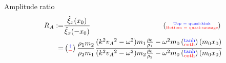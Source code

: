 \documentclass[table]{beamer}
\begin{document}
\begin{frame}
\begin{figure}
\end{figure}
\vspace{-0.3cm}
\begin{block}{Amplitude ratio}
\vspace{-0.3cm}
\begin{align*}
R_A :=& \frac{\hat{\xi}_x(x_0)}{\hat{\xi}_x(-x_0)} \qquad \qquad \qquad \qquad \qquad \left(\substack{\text{\textcolor{blue}{\tiny Top = quasi-kink}} \\ \text{\tiny \textcolor{red}{Bottom = quasi-sausage}}}\right)\\
=&\left(\substack{\textcolor{blue}{+} \\ \textcolor{red}{-}}\right) \frac{\rho_1m_2}{\rho_2m_1}\frac{(k^2{v_A}^2-\omega^2)m_1\frac{\rho_0}{\rho_1}-\omega^2{m_0}\left(\substack{\textcolor{blue}{\tanh} \\ \textcolor{red}{\coth}}\right){({m_0}x_0)}}{(k^2{v_A}^2-\omega^2)m_2\frac{\rho_0}{\rho_2}-\omega^2{m_0}\left(\substack{\textcolor{blue}{\tanh} \\ \textcolor{red}{\coth}}\right){({m_0}x_0)}}
\end{align*}
\end{block}
\end{frame}
\end{document}
